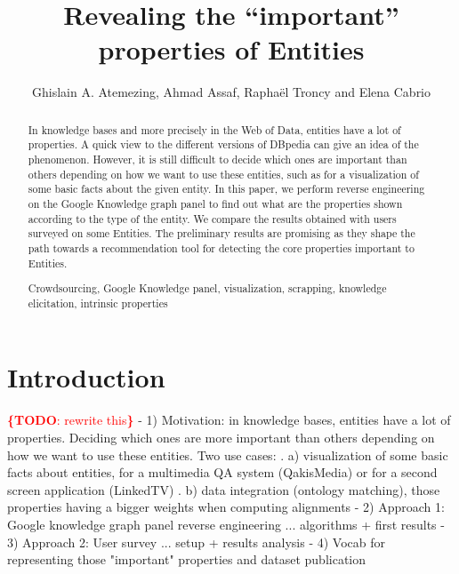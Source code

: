\documentclass[runningheads,a4paper]{llncs}
\newcommand{\keywords}[1]{\par\addvspace\baselineskip
\noindent\keywordname\enspace\ignorespaces#1}
\newcommand{\todo}[1]{\noindent\textcolor{red}{{\bf \{TODO}: #1{\bf \}}}}
\begin{document}
\title{Revealing the ``important'' properties of Entities}

\author{Ghislain A. Atemezing, Ahmad Assaf, Rapha\"{e}l Troncy and Elena Cabrio }



\maketitle


\begin{abstract}
In knowledge bases and more precisely in the Web of Data, entities have a lot of properties. A quick view to the different versions of DBpedia can give an idea of the phenomenon. However, it is still difficult to decide which ones are important than others depending on how we want to use these entities, such as for a visualization of some basic facts about the given entity. In this paper, we perform reverse engineering on the Google Knowledge graph panel to find out what are the properties shown according to the type of the entity. We compare the results obtained with users surveyed on some Entities. The preliminary results are promising as they shape the path towards a recommendation tool for detecting the core properties important to Entities.
\keywords{Crowdsourcing, Google Knowledge panel, visualization, scrapping, knowledge elicitation, intrinsic properties}
\end{abstract}


\section{Introduction}
\label{sec:intro}
\todo{rewrite this}
- 1) Motivation: in knowledge bases, entities have a lot of properties. Deciding which ones are more important than others depending on how we want to use these entities. Two use cases:
   . a) visualization of some basic facts about entities, for a multimedia QA system (QakisMedia) or for a second screen application (LinkedTV)
   . b) data integration (ontology matching), those properties having a bigger weights when computing alignments
 - 2) Approach 1: Google knowledge graph panel reverse engineering ... algorithms + first results
 - 3) Approach 2: User survey ... setup + results analysis
 - 4) Vocab for representing those "important" properties and dataset publication
\end{document}
